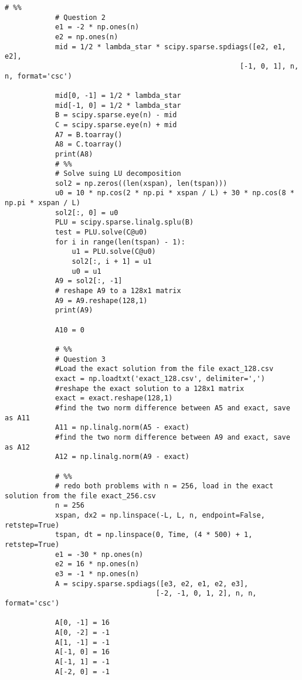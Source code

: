 \documentclass[a4paper,12pt, fleqn]{article}
\begin{document}
\begin{enumerate}
\begin{lstlisting}[basicstyle=\tiny]
            # %%
            # Question 2
            e1 = -2 * np.ones(n)
            e2 = np.ones(n)
            mid = 1/2 * lambda_star * scipy.sparse.spdiags([e2, e1, e2],
                                                        [-1, 0, 1], n, n, format='csc')

            mid[0, -1] = 1/2 * lambda_star
            mid[-1, 0] = 1/2 * lambda_star
            B = scipy.sparse.eye(n) - mid
            C = scipy.sparse.eye(n) + mid
            A7 = B.toarray()
            A8 = C.toarray()
            print(A8)
            # %%
            # Solve suing LU decomposition 
            sol2 = np.zeros((len(xspan), len(tspan)))
            u0 = 10 * np.cos(2 * np.pi * xspan / L) + 30 * np.cos(8 * np.pi * xspan / L)
            sol2[:, 0] = u0
            PLU = scipy.sparse.linalg.splu(B)
            test = PLU.solve(C@u0)
            for i in range(len(tspan) - 1):
                u1 = PLU.solve(C@u0)
                sol2[:, i + 1] = u1
                u0 = u1
            A9 = sol2[:, -1]
            # reshape A9 to a 128x1 matrix
            A9 = A9.reshape(128,1)
            print(A9)

            A10 = 0 

            # %%
            # Question 3
            #Load the exact solution from the file exact_128.csv 
            exact = np.loadtxt('exact_128.csv', delimiter=',')
            #reshape the exact solution to a 128x1 matrix
            exact = exact.reshape(128,1)
            #find the two norm difference between A5 and exact, save as A11
            A11 = np.linalg.norm(A5 - exact)
            #find the two norm difference between A9 and exact, save as A12
            A12 = np.linalg.norm(A9 - exact)

            # %%
            # redo both problems with n = 256, load in the exact solution from the file exact_256.csv
            n = 256
            xspan, dx2 = np.linspace(-L, L, n, endpoint=False, retstep=True)
            tspan, dt = np.linspace(0, Time, (4 * 500) + 1, retstep=True)
            e1 = -30 * np.ones(n)
            e2 = 16 * np.ones(n)
            e3 = -1 * np.ones(n)
            A = scipy.sparse.spdiags([e3, e2, e1, e2, e3],
                                    [-2, -1, 0, 1, 2], n, n, format='csc')

            A[0, -1] = 16
            A[0, -2] = -1
            A[1, -1] = -1
            A[-1, 0] = 16
            A[-1, 1] = -1
            A[-2, 0] = -1


\end{lstlisting}
\end{enumerate}
\end{document}
